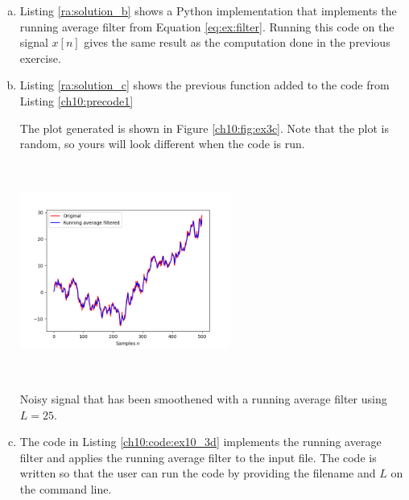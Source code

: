 \begin{enumerate}
\begin{enumerate}[a)]
          \item Listing \ref{ra:solution_b} shows a Python implementation that implements the
                running average filter from Equation \ref{eq:ex:filter}.
                Running this code on the signal $x[n]$ gives the same result as the
                computation done in the previous exercise.
                

          \item Listing \ref{ra:solution_c} shows the previous function added to the code from Listing \ref{ch10:precode1}
                
                The plot generated is shown in Figure \ref{ch10:fig:ex3c}.
                Note that the plot is random, so yours will look different when the code is run.

                \begin{marginfigure}
                  \begin{center}
                    \includegraphics[width=6.9cm, height=7.0cm]{ch10/figures/ex10_3c.png}
                    \caption{Noisy signal that has been smoothened with a running average
                      filter using $L=25$.}
                    \label{ch10:fig:ex3c}
                  \end{center}
                \end{marginfigure}

          \item The code in Listing \ref{ch10:code:ex10_3d} implements the running average filter
                and applies the running average filter to the input file. The code is written
                so that the user can run the code by providing the filename and $L$ on the command line.
                


\end{enumerate}
\end{enumerate}

